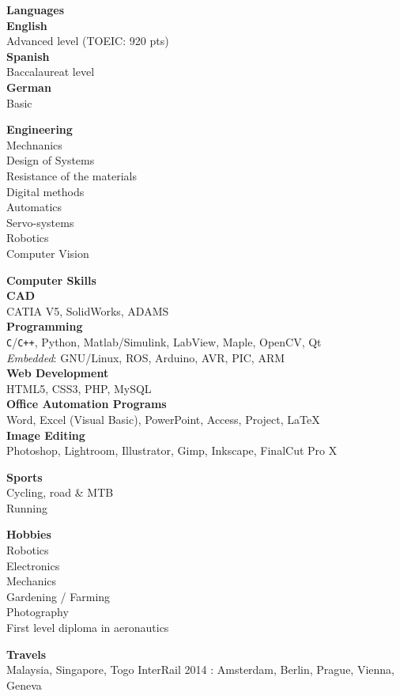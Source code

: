 \documentclass[a4paper,11pt,final]{memoir}
\newcommand{\SmallSep}{\vspace{0.5em}}
\newcommand{\SkillSection}[1]
	{\normalsize{\textbf{#1\\}}\normalfont\small}%
\newcommand{\SkillItem}[1]
	{\textbf{\color{RoyalBlue} #1}\normalfont\\}
\begin{document}
\begin{flushleft}
\SkillSection{Languages}
\SkillItem{English}
Advanced level (TOEIC: 920 pts)\\
\SkillItem{Spanish}
Baccalaureat level\\
\SkillItem{German}
Basic
\SmallSep

\SkillSection{Engineering}
Mechnanics\\
Design of Systems\\
Resistance of the materials\\
Digital methods\\
Automatics\\
Servo-systems\\
Robotics\\
Computer Vision
\SmallSep

\SkillSection{Computer Skills}
\SkillItem{CAD}
CATIA V5, SolidWorks, ADAMS\\
\SkillItem{Programming}
\verb!C!/\verb!C++!, Python, Matlab/Simulink, LabView, Maple, OpenCV, Qt\\
\emph{Embedded}: GNU/Linux, ROS, Arduino, AVR, PIC, ARM\\%
\SkillItem{Web Development}
HTML5, CSS3, PHP, MySQL\\
\SkillItem{Office Automation Programs}
Word, Excel (Visual Basic), PowerPoint, Access, Project, \LaTeX\\
\SkillItem{Image Editing}
Photoshop, Lightroom, Illustrator, Gimp, Inkscape, FinalCut Pro X\\
\SmallSep

\SkillSection{Sports}
Cycling, road \& MTB\\
Running\\
\SmallSep

\SkillSection{Hobbies}
Robotics\\
Electronics\\
Mechanics\\
Gardening / Farming\\
Photography\\
First level diploma in aeronautics\SmallSep

\SkillSection{Travels}
Malaysia, Singapore, Togo
InterRail 2014 : Amsterdam, Berlin, Prague, Vienna, Geneva
\end{flushleft}
\framebreak
\end{document}
